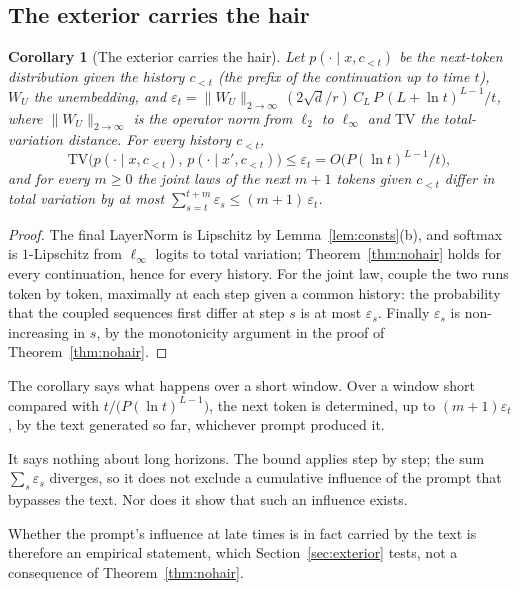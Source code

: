 \documentclass[11pt]{article}
\newtheorem{corollary}{Corollary}
\theoremstyle{definition}
\theoremstyle{remark}
\begin{document}
\subsection{The exterior carries the hair}
\label{sec:theory-exterior}

\begin{corollary}[The exterior carries the hair]\label{cor:exterior}
Let $p(\cdot\mid x,c_{<t})$ be the next-token distribution given the history $c_{<t}$ (the prefix of the continuation up to time $t$), $W_U$ the unembedding, and $\varepsilon_t=\|W_U\|_{2\to\infty}\,(2\sqrt d/r)\,C_L\,P\,(L+\ln t)^{L-1}/t$, where $\|W_U\|_{2\to\infty}$ is the operator norm from $\ell_2$ to $\ell_\infty$ and $\mathrm{TV}$ the total-variation distance. For every history $c_{<t}$,
\[
\mathrm{TV}\big(p(\cdot\mid x,c_{<t}),\,p(\cdot\mid x',c_{<t})\big)\le\varepsilon_t=O\big(P(\ln t)^{L-1}/t\big),
\]
and for every $m\ge0$ the joint laws of the next $m+1$ tokens given $c_{<t}$ differ in total variation by at most $\sum_{s=t}^{t+m}\varepsilon_s\le(m+1)\,\varepsilon_t$.
\end{corollary}
\begin{proof}
The final LayerNorm is Lipschitz by Lemma~\ref{lem:consts}(b), and softmax is $1$-Lipschitz from $\ell_\infty$ logits to total variation; Theorem~\ref{thm:nohair} holds for every continuation, hence for every history. For the joint law, couple the two runs token by token, maximally at each step given a common history: the probability that the coupled sequences first differ at step $s$ is at most $\varepsilon_s$. Finally $\varepsilon_s$ is non-increasing in $s$, by the monotonicity argument in the proof of Theorem~\ref{thm:nohair}.
\end{proof}

The corollary says what happens over a short window. Over a window short compared with $t/\big(P(\ln t)^{L-1}\big)$, the next token is determined, up to $(m+1)\varepsilon_t$, by the text generated so far, whichever prompt produced it.

It says nothing about long horizons. The bound applies step by step; the sum $\sum_s\varepsilon_s$ diverges, so it does not exclude a cumulative influence of the prompt that bypasses the text. Nor does it show that such an influence exists.

Whether the prompt's influence at late times is in fact carried by the text is therefore an empirical statement, which Section~\ref{sec:exterior} tests, not a consequence of Theorem~\ref{thm:nohair}.
\end{document}
